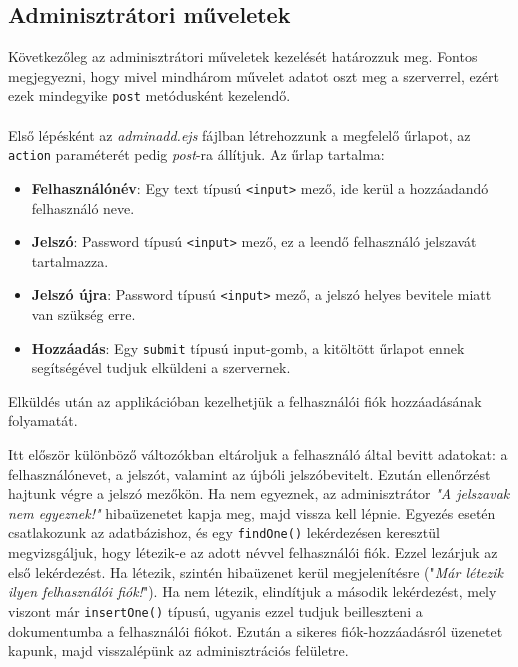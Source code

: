 \subsection{Adminisztrátori műveletek}

Következőleg az adminisztrátori műveletek kezelését határozzuk meg. Fontos megjegyezni, hogy mivel mindhárom művelet adatot oszt meg a szerverrel, ezért ezek mindegyike \texttt{post} metódusként kezelendő.\\

\\

Első lépésként az \textit{adminadd.ejs} fájlban létrehozzunk a megfelelő űrlapot, az \texttt{action} paraméterét pedig \textit{post}-ra állítjuk. Az űrlap tartalma:

\begin{itemize}
\item{\textbf{Felhasználónév}: Egy text típusú \texttt{<input>} mező, ide kerül a hozzáadandó felhasználó neve.}
\item{\textbf{Jelszó}: Password típusú \texttt{<input>} mező, ez a leendő felhasználó jelszavát tartalmazza.}
\item{\textbf{Jelszó újra}: Password típusú \texttt{<input>} mező, a jelszó helyes bevitele miatt van szükség erre.}
\item{\textbf{Hozzáadás}: Egy \texttt{submit} típusú input-gomb, a kitöltött űrlapot ennek segítségével tudjuk elküldeni a szervernek.}
\end{itemize}

Elküldés után az applikációban kezelhetjük a felhasználói fiók hozzáadásának folyamatát.

Itt először különböző változókban eltároljuk a felhasználó által bevitt adatokat: a felhasználónevet, a jelszót, valamint az újbóli jelszóbevitelt. Ezután ellenőrzést hajtunk végre a jelszó mezőkön. Ha nem egyeznek, az adminisztrátor \textit{"A jelszavak nem egyeznek!"} hibaüzenetet kapja meg, majd vissza kell lépnie. Egyezés esetén csatlakozunk az adatbázishoz, és egy \texttt{findOne()} lekérdezésen keresztül megvizsgáljuk, hogy létezik-e az adott névvel felhasználói fiók. Ezzel lezárjuk az első lekérdezést. Ha létezik, szintén hibaüzenet kerül megjelenítésre ("\textit{Már létezik ilyen felhasználói fiók!}"). Ha nem létezik, elindítjuk a második lekérdezést, mely viszont már \texttt{insertOne()} típusú, ugyanis ezzel tudjuk beilleszteni a dokumentumba a felhasználói fiókot. Ezután a sikeres fiók-hozzáadásról üzenetet kapunk, majd visszalépünk az adminisztrációs felületre.\\

